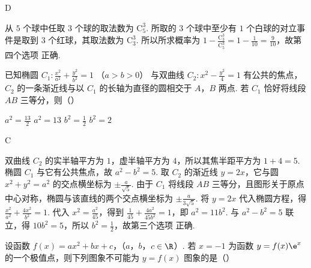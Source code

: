 \begin{answer}
D
\end{answer}

\begin{solution}
从 \(5\) 个球中任取 \(3\) 个球的取法数为 \(\mathrm C_5^3\). 所取的 \(3\) 个球中至少有 \(1\) 个白球的对立事件是取到 \(3\) 个红球，其取法数为 \(\mathrm C_3^3\). 所以所求概率为 \(1-\frac{\mathrm C_3^3}{\mathrm C_5^3}=1-\frac1{10}=\frac9{10}\)，故第四个选项 正确.
\end{solution}

\begin{problem}
已知椭圆 \(C_{1}: \frac{x^{2}}{a^{2}} + \frac{y^{2}}{b^{2}} = 1\) （\(a>b>0\)） 与双曲线 \(C_2: x^{2} - \frac{y^{2}}{4} = 1\) 有公共的焦点， \(C_2\) 的一条渐近线与以 \(C_1\) 的长轴为直径的圆相交于 \(A\)，\(B\) 两点. 若 \(C_1\) 恰好将线段 \(AB\) 三等分，则（\quad）

\choices
    {\(a^2 = \frac{13}{2}\)}
    {\(a^2 = 13\)}
    {\(b^{2} = \frac{1}{2}\)}
    {\(b^{2} = 2\)}
\end{problem}

\begin{answer}
C
\end{answer}

\begin{solution}
双曲线 \(C_2\) 的实半轴平方为 \(1\)，虚半轴平方为 \(4\)，所以其焦半距平方为 \(1+4=5\). 椭圆 \(C_1\) 与它有公共焦点，故 \(a^2-b^2=5\). 取 \(C_2\) 的渐近线 \(y=2x\)，它与圆 \(x^2+y^2=a^2\) 的交点横坐标为 \(\pm\frac{a}{\sqrt5}\). 由于 \(C_1\) 将线段 \(AB\) 三等分，且图形关于原点中心对称，椭圆与该直线的两个交点横坐标为 \(\pm\frac{a}{3\sqrt5}\). 将 \(y=2x\) 代入椭圆方程，得 \(\frac{x^2}{a^2}+\frac{4x^2}{b^2}=1\). 代入 \(x^2=\frac{a^2}{45}\)，得到 \(\frac1{45}+\frac{4a^2}{45b^2}=1\)，即 \(a^2=11b^2\). 与 \(a^2-b^2=5\) 联立，得 \(10b^2=5\)，所以 \(b^2=\frac12\)，故第三个选项 正确.
\end{solution}

\begin{problem}
设函数 \( f(x) = ax^2 + bx + c \)，（\(a\)，\(b\)，\(c\in\R\)）. 若 \(x = -1\) 为函数 \( y = f(x)\e^x \) 的一个极值点，则下列图象不可能为 \( y = f(x) \) 图象的是（\quad）

    {}
    {}
    {}
\end{problem}


